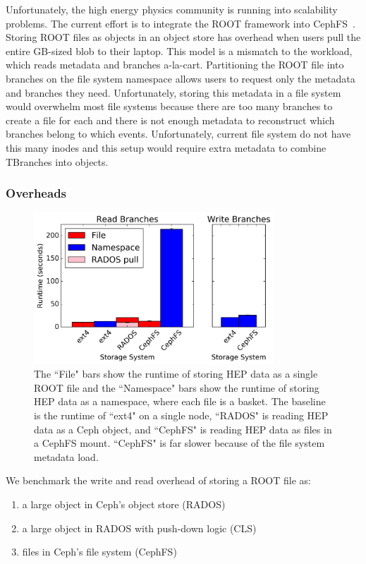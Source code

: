 Unfortunately, the high energy physics community is running into scalability
problems.  The current effort is to integrate the ROOT framework into
CephFS~\cite{weil:osdi2006-ceph}.  Storing ROOT files as objects in an object
store has overhead when users pull the entire GB-sized blob to their laptop.
This model is a mismatch to the workload, which reads metadata and branches
a-la-cart. Partitioning the ROOT file into branches on the file system
namespace allows users to request only the metadata and branches they need.
Unfortunately, storing this metadata in a file system would overwhelm most file
systems because there are too many branches to create a file for each and there
is not enough metadata to reconstruct which branches belong to which events.
Unfortunately, current file system do not have this many inodes and this setup
would require extra metadata to combine TBranches into objects.

\subsubsection{Overheads}

\begin{figure}[tb]
\centering
  \includegraphics[width=90mm]{figures/hep_runtime.png} 
  \caption{The ``File" bars show the runtime of storing HEP data as a single
  ROOT file and the ``Namespace" bars show the runtime of storing HEP data as a
  namespace, where each file is a basket. The baseline is the runtime of ``ext4"
  on a single node, ``RADOS" is reading HEP data as a Ceph object, and ``CephFS"
  is reading HEP data as files in a CephFS mount. ``CephFS" is far slower because
  of the file system metadata load.}
  \label{fig:hep_runtime}
\end{figure}

We benchmark the write and read overhead of storing a ROOT file as:

\begin{enumerate}
  \item a large object in Ceph's object store (RADOS)
  \item a large object in RADOS with push-down logic (CLS)
  \item files in Ceph's file system (CephFS)
\end{enumerate}

